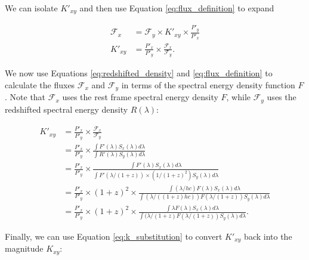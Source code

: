 \documentclass[linenumbers]{aastex631}
\begin{document}
We can isolate $K'_{xy}$ and then use Equation \ref{eq:flux_definition} to expand

\begin{equation}
\begin{aligned}
  \mathcal{F}_x &= \mathcal{F}_y \times K'_{xy} \times \frac{P'_y}{P'_x} \\
        K'_{xy} &= \frac{P'_x}{P'_y} \times \frac{\mathcal{F}_x}{\mathcal{F}_y} .
\end{aligned}
\end{equation}

We now use Equations \ref{eq:redshifted_density} and \ref{eq:flux_definition}
to calculate the fluxes $\mathcal{F}_x$ and $\mathcal{F}_y$ in terms of the
spectral energy density function $F$. Note that $\mathcal{F}_x$ uses the rest
frame spectral energy density $F$, while $\mathcal{F}_y$ uses the redshifted
spectral energy density $R(\lambda)$:

\begin{equation}
\begin{aligned}
  K'_{xy} &= \frac{P'_x}{P'_y} \times \frac{\mathcal{F}_x}{\mathcal{F}_y} \\
         &= \frac{P'_x}{P'_y} \times
              \frac{\int F'(\lambda) S_x(\lambda) d\lambda}
                   {\int R'(\lambda) S_y(\lambda) d\lambda} \\
         &= \frac{P'_x}{P'_y} \times
              \frac{\int F'(\lambda) S_x(\lambda) d\lambda}
                   {\int F'(\lambda / (1+z)) \times (1 / (1 + z)^2) S_y(\lambda) d\lambda} \\
         &= \frac{P'_x}{P'_y} \times (1+z)^2 \times
              \frac{\int (\lambda / hc) F(\lambda) S_x(\lambda) d\lambda}
                   {\int (\lambda / ((1+z)hc)) F(\lambda / (1+z)) S_y(\lambda) d\lambda} \\
         &= \frac{P'_x}{P'_y} \times (1 + z)^2 \times
              \frac{\int \lambda F(\lambda) S_x(\lambda) d\lambda}
                   {\int (\lambda / (1+z) F(\lambda / (1+z)) S_y(\lambda) d\lambda} .
\end{aligned}
\end{equation}

Finally, we can use Equation \ref{eq:k_substitution} to convert $K'_{xy}$ back
into the magnitude $K_{xy}$:
\end{document}

